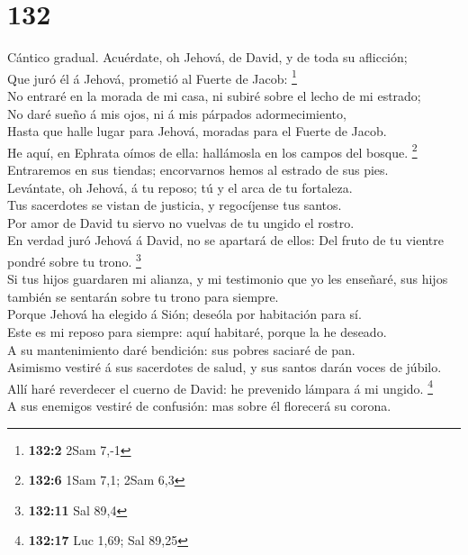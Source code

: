 \hypertarget{section-131}{%
\section{132}\label{section-131}}

 Cántico gradual. Acuérdate, oh Jehová, de David, y de
toda su aflicción;\\
 Que juró él á Jehová, prometió al Fuerte de Jacob:
\footnote{\textbf{132:2} 2Sam 7,-1}\\
 No entraré en la morada de mi casa, ni subiré sobre el
lecho de mi estrado;\\
 No daré sueño á mis ojos, ni á mis párpados
adormecimiento,\\
 Hasta que halle lugar para Jehová, moradas para el Fuerte
de Jacob.\\
 He aquí, en Ephrata oímos de ella: hallámosla en los
campos del bosque. \footnote{\textbf{132:6} 1Sam 7,1; 2Sam 6,3}\\
 Entraremos en sus tiendas; encorvarnos hemos al estrado
de sus pies.\\
 Levántate, oh Jehová, á tu reposo; tú y el arca de tu
fortaleza.\\
 Tus sacerdotes se vistan de justicia, y regocíjense tus
santos.\\
 Por amor de David tu siervo no vuelvas de tu ungido el
rostro.\\
 En verdad juró Jehová á David, no se apartará de ellos:
Del fruto de tu vientre pondré sobre tu trono. \footnote{\textbf{132:11}
  Sal 89,4}\\
 Si tus hijos guardaren mi alianza, y mi testimonio que
yo les enseñaré, sus hijos también se sentarán sobre tu trono para
siempre.\\
 Porque Jehová ha elegido á Sión; deseóla por habitación
para sí.\\
 Este es mi reposo para siempre: aquí habitaré, porque la
he deseado.\\
 A su mantenimiento daré bendición: sus pobres saciaré de
pan.\\
 Asimismo vestiré á sus sacerdotes de salud, y sus santos
darán voces de júbilo.\\
 Allí haré reverdecer el cuerno de David: he prevenido
lámpara á mi ungido. \footnote{\textbf{132:17} Luc 1,69; Sal 89,25}\\
 A sus enemigos vestiré de confusión: mas sobre él
florecerá su corona.

